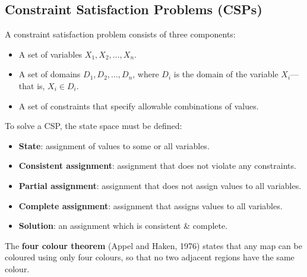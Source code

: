 
\subsection{Constraint Satisfaction Problems (CSPs)}
\label{sub:constraint_satisfaction_problems_csps}

A constraint satisfaction problem consists of three components:\\
\begin{itemize}
    \item A set of variables $X_1, X_2, \ldots, X_n$.
    \item A set of domains $D_1, D_2, \ldots, D_n$, where $D_{i}$ is the domain of the variable $X_{i}$---that is, $X_{i} \in D_{i}$.
    \item A set of constraints that specify allowable combinations of values.
\end{itemize}

\begin{definition}
    To solve a CSP, the state space must be defined:\\
    \begin{itemize}
        \item \textbf{State}: assignment of values to some or all variables.
        \item \textbf{Consistent assignment}: assignment that does not violate any constraints.
        \item \textbf{Partial assignment}: assignment that does not assign values to all variables.
        \item \textbf{Complete assignment}: assignment that assigns values to all variables.
        \item \textbf{Solution}: an assignment which is consistent \& complete.
    \end{itemize}
\end{definition}

\begin{definition}
    The \textbf{four colour theorem} (Appel and Haken, 1976) states that any map can be coloured using only four colours, so that no two adjacent regions have the same colour.
\end{definition}

